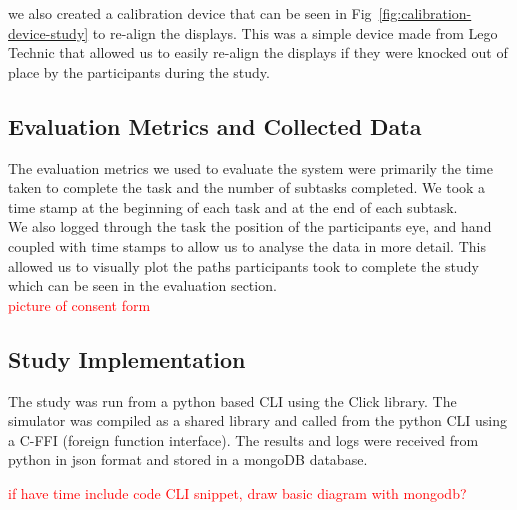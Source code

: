 we also created a calibration device that can be seen in Fig~\ref{fig:calibration-device-study} to re-align the displays. This was a simple device made from Lego Technic \tocite that allowed us to easily re-align the displays if they were knocked out of place by the participants during the study.

\subsection{Evaluation Metrics and Collected Data}
The evaluation metrics we used to evaluate the system were primarily the time taken to complete the task and the number of subtasks completed. We took a time stamp at the beginning of each task and at the end of each subtask. \\

We also logged through the task the position of the participants eye, and hand coupled with time stamps to allow us to analyse the data in more detail. This allowed us to visually plot the paths participants took to complete the study which can be seen in the evaluation section. \\

\textcolor{red}{picture of consent form}

\subsection{Study Implementation}

The study was run from a python based CLI using the Click library. The simulator was compiled as a shared library and called from the python CLI using a C-FFI (foreign function interface). The results and logs were received from python in json format and stored in a mongoDB database.

\textcolor{red}{if have time include code CLI snippet, draw basic diagram with mongodb?}
